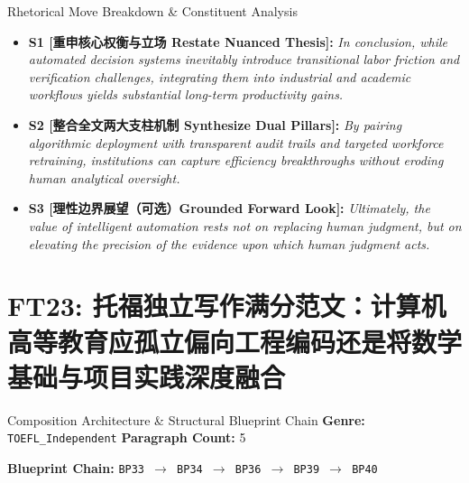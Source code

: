 \begin{TipBox}{Rhetorical Move Breakdown \& Constituent Analysis}
\begin{itemize}[leftmargin=1.5em]
  \item \textbf{S1 [重申核心权衡与立场 Restate Nuanced Thesis]:} \textit{In conclusion, while automated decision systems inevitably introduce transitional labor friction and verification challenges, integrating them into industrial and academic workflows yields substantial long-term productivity gains.}\par{}
  \item \textbf{S2 [整合全文两大支柱机制 Synthesize Dual Pillars]:} \textit{By pairing algorithmic deployment with transparent audit trails and targeted workforce retraining, institutions can capture efficiency breakthroughs without eroding human analytical oversight.}\par{}
  \item \textbf{S3 [理性边界展望（可选）Grounded Forward Look]:} \textit{Ultimately, the value of intelligent automation rests not on replacing human judgment, but on elevating the precision of the evidence upon which human judgment acts.}\par{}
\end{itemize}
\end{TipBox}
\medskip
\clearpage
\section{FT23: 托福独立写作满分范文：计算机高等教育应孤立偏向工程编码还是将数学基础与项目实践深度融合}\label{comp:FT23}
\begin{ConceptBox}{Composition Architecture \& Structural Blueprint Chain}
\textbf{Genre:} \texttt{TOEFL\_Independent} \quad \textbf{Paragraph Count:} 5\par
\textbf{Blueprint Chain:} \texttt{BP33 $\to$ BP34 $\to$ BP36 $\to$ BP39 $\to$ BP40}
\end{ConceptBox}

